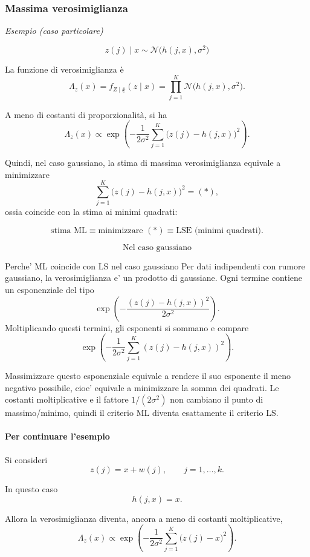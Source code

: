\documentclass[11pt,a4paper]{article}
\begin{document}
\subsubsection*{Massima verosimiglianza}

\textit{Esempio (caso particolare)}

\[
z(j)\mid x \sim \mathcal{N}\bigl(h(j,x),\sigma^2\bigr)
\]

La funzione di verosimiglianza è
\[
\Lambda_z(x)=f_{Z\mid \overline{\underline{x}}}(z\mid x)
=\prod_{j=1}^{K}\mathcal{N}\bigl(h(j,x),\sigma^2\bigr).
\]

A meno di costanti di proporzionalità, si ha
\[
\Lambda_z(x)\propto
\exp\!\left(
-\frac{1}{2\sigma^2}\sum_{j=1}^{K}\bigl(z(j)-h(j,x)\bigr)^2
\right).
\]

Quindi, nel caso gaussiano, la stima di massima verosimiglianza equivale a minimizzare
\[
\sum_{j=1}^{K}\bigl(z(j)-h(j,x)\bigr)^2 = (*),
\]
ossia coincide con la stima ai minimi quadrati:

\[
\text{stima ML} \equiv \text{minimizzare }(*) \equiv \text{LSE (minimi quadrati)}.
\]

\[
\boxed{\text{Nel caso gaussiano}}
\]

\begin{spiegazione}{Perche' ML coincide con LS nel caso gaussiano}
Per dati indipendenti con rumore gaussiano, la verosimiglianza e' un prodotto di gaussiane. Ogni termine contiene un esponenziale del tipo
\[
\exp\!\left(
-\frac{(z(j)-h(j,x))^2}{2\sigma^2}
\right).
\]
Moltiplicando questi termini, gli esponenti si sommano e compare
\[
\exp\!\left(
-\frac{1}{2\sigma^2}
\sum_{j=1}^{K}(z(j)-h(j,x))^2
\right).
\]

Massimizzare questo esponenziale equivale a rendere il suo esponente il meno negativo possibile, cioe' equivale a minimizzare la somma dei quadrati. Le costanti moltiplicative e il fattore $1/(2\sigma^2)$ non cambiano il punto di massimo/minimo, quindi il criterio ML diventa esattamente il criterio LS.
\end{spiegazione}

\paragraph{Per continuare l'esempio}
Si consideri
\[
z(j)=x+w(j),
\qquad j=1,\dots,k.
\]

In questo caso
\[
h(j,x)=x.
\]

Allora la verosimiglianza diventa, ancora a meno di costanti moltiplicative,
\[
\Lambda_z(x)\propto
\exp\!\left(
-\frac{1}{2\sigma^2}\sum_{j=1}^{K}\bigl(z(j)-x\bigr)^2
\right).
\]
\end{document}
